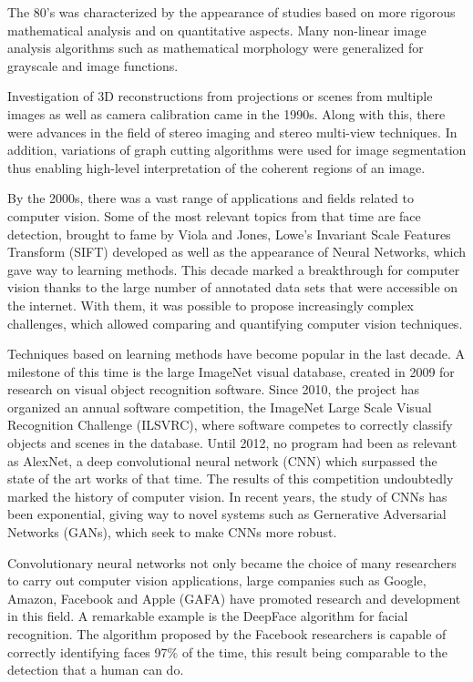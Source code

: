 The 80's was characterized by the appearance of studies based on more rigorous mathematical analysis and on quantitative aspects. Many non-linear image analysis algorithms such as mathematical morphology were generalized for grayscale and image functions.

Investigation of 3D reconstructions from projections or scenes from multiple images as well as camera calibration came in the 1990s. Along with this, there were advances in the field of stereo imaging and stereo multi-view techniques. In addition, variations of graph cutting algorithms were used for image segmentation thus enabling high-level interpretation of the coherent regions of an image.

By the 2000s, there was a vast range of applications and fields related to computer vision. Some of the most relevant topics from that time are face detection, brought to fame by Viola and Jones, Lowe's Invariant Scale Features Transform (SIFT) developed as well as the appearance of Neural Networks, which gave way to learning methods. This decade marked a breakthrough for computer vision thanks to the large number of annotated data sets that were accessible on the internet. With them, it was possible to propose increasingly complex challenges, which allowed comparing and quantifying computer vision techniques.

Techniques based on learning methods have become popular in the last decade. A milestone of this time is the large ImageNet visual database, created in 2009 for research on visual object recognition software. Since 2010, the project has organized an annual software competition, the ImageNet Large Scale Visual Recognition Challenge (ILSVRC), where software competes to correctly classify objects and scenes in the database. Until 2012, no program had been as relevant as AlexNet, a deep convolutional neural network (CNN) which surpassed the state of the art works of that time. The results of this competition undoubtedly marked the history of computer vision. In recent years, the study of CNNs has been exponential, giving way to novel systems such as Gernerative Adversarial Networks (GANs), which seek to make CNNs more robust.

Convolutionary neural networks not only became the choice of many researchers to carry out computer vision applications, large companies such as Google, Amazon, Facebook and Apple (GAFA) have promoted research and development in this field. A remarkable example is the DeepFace algorithm for facial recognition. The algorithm proposed by the Facebook researchers is capable of correctly identifying faces 97$\%$ of the time, this result being comparable to the detection that a human can do.

